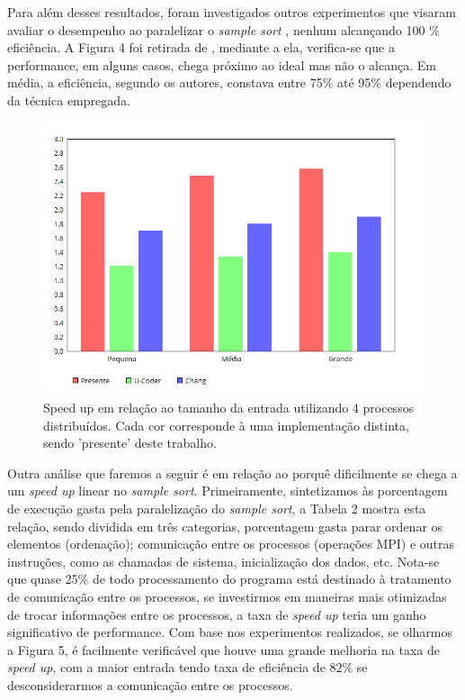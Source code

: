 \documentclass[letterpaper, 10 pt, conference]{ieeeconf}  %
\begin{document}
Para além desses resultados, foram investigados outros experimentos que visaram avaliar o desempenho ao paralelizar o \textit{sample sort} \cite{c8,c9}, nenhum alcançando 100 \% eficiência. A Figura 4 foi retirada de \cite{c8}, mediante a ela, verifica-se que a performance, em alguns casos, chega próximo ao ideal mas não o alcança. Em média, a eficiência, segundo os autores, constava entre 75\% até 95\% dependendo da técnica empregada.


\begin{figure}[htbp]
      \centering
      \includegraphics[scale=0.35]{comparison.png}
      \caption{ Speed up em relação ao tamanho da entrada utilizando 4 processos distribuídos. Cada cor corresponde à uma implementação distinta, sendo 'presente' deste trabalho. }
      \label{figurelabel4}
\end{figure}

Outra análise que faremos a seguir é em relação ao porquê dificilmente se chega a um \textit{speed up} linear no \textit{sample sort}. Primeiramente, sintetizamos às porcentagem de execução gasta pela paralelização do \textit{sample sort}, a Tabela 2 mostra esta relação, sendo dividida em três categorias, porcentagem gasta parar ordenar os elementos (ordenação); comunicação entre os processos (operações MPI) e outras instruções, como as chamadas de sistema, inicialização dos dados, etc. Nota-se que quase 25\% de todo processamento do programa está destinado à tratamento de comunicação entre os processos, se investirmos em maneiras mais otimizadas de trocar informações entre os processos, a taxa de \textit{speed up} teria um ganho significativo de performance. Com base nos experimentos realizados, se olharmos a Figura 5, é facilmente verificável que houve uma grande melhoria na taxa de \textit{speed up}, com a maior entrada tendo taxa de eficiência de 82\% se desconsiderarmos a comunicação entre os processos.
\end{document}
